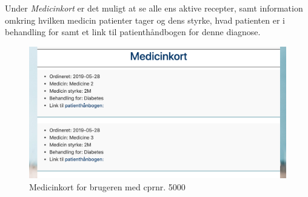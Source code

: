 \newpage
Under \textit{Medicinkort} er det muligt at se alle ens aktive recepter, samt information omkring hvilken medicin patienter tager og dens styrke, hvad patienten er i behandling for samt et link til patienthåndbogen for denne diagnose.
\begin{figure}[h!]
	\includegraphics[width=\linewidth]{Materials/Prototype/medicinkort}
	\caption{Medicinkort for brugeren med cprnr. 5000}
\end{figure}